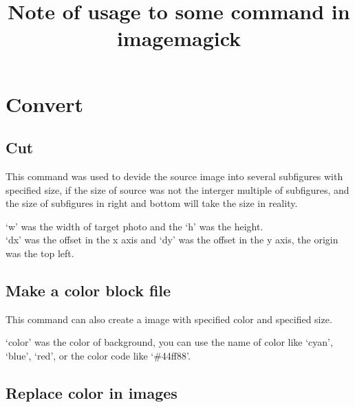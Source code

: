 \documentclass[12pt]{article}
\begin{document}
\title{Note of usage to some command in imagemagick}
\author{}
\maketitle
\tableofcontents
\section{Convert}
\subsection{Cut}
{\centering{}\par}\vspace{5mm}

This command was used to devide the source image into several subfigures with specified size, if the size of source was not the interger multiple of subfigures, and the size of subfigures in right and bottom will take the size in reality.\\

{\centering{}\par}\vspace{5mm}

`w' was the width of target photo and the `h' was the height.\\
`dx' was the offset in the x axis and `dy' was the offset in the y axis, the origin was the top left.

\subsection{Make a color block file}
{\centering{}\par}\vspace{5mm}

This command can also create a image with specified color and specified size.\\

{\centering{}\par}\vspace{5mm}

`color' was the color of background, you can use the name of color like `cyan', `blue', `red', or the color code like `\#44f\mbox{}f88'.

\subsection{Replace color in images}
{\centering{}\par}\vspace{5mm}
\end{document}
